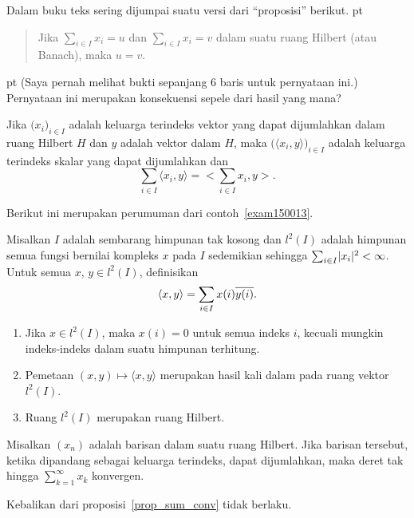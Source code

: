 \begin{rem} Dalam buku teks sering dijumpai suatu versi dari
``proposisi'' berikut.
 pt
\begin{quote}
Jika $\sum_{i \in I}x_i = u$ dan $\sum_{i \in I}x_i = v$ dalam suatu
ruang Hilbert (atau Banach), maka $u = v$.
\end{quote}

  pt
\noindent (Saya pernah melihat bukti sepanjang 6 baris untuk pernyataan ini.) Pernyataan ini merupakan
konsekuensi sepele dari hasil yang mana?
\end{rem}

\begin{prop} Jika $\bigl(x_i\bigr)_{i \in I}$ adalah keluarga terindeks vektor yang dapat dijumlahkan dalam ruang Hilbert $H$ dan
$y$ adalah vektor dalam $H$, maka $\bigl(\langle x_i,y \rangle\bigr)_{i \in I}$ adalah keluarga terindeks skalar yang dapat dijumlahkan dan
   \[ \sum_{i \in I}\langle x_i,y \rangle  = \biggl < \sum_{i \in I} x_i, y \biggr >. \]
\end{prop}

Berikut ini merupakan perumuman dari contoh~\ref{exam150013}.

\begin{exam} Misalkan $I$ adalah sembarang himpunan tak kosong dan $l^2(I)$ adalah himpunan semua fungsi bernilai kompleks $x$ pada $I$ sedemikian sehingga
$\sum_{i \in I}\lvert x_i\rvert^2 < \infty$. Untuk semua $x$, $y \in l^2(I)$, definisikan
    \[ \langle x,y \rangle = \sum_{i \in I}x(i)\overline{y(i)}.\]
  \begin{enumerate}
    \item Jika $x \in l^2(I)$, maka $x(i) = 0$ untuk semua indeks $i$, kecuali mungkin indeks-indeks dalam suatu himpunan terhitung.
    \item Pemetaan $(x,y) \mapsto \langle x,y \rangle$ merupakan hasil kali dalam pada ruang vektor $l^2(I)$.
    \item Ruang $l^2(I)$ merupakan ruang Hilbert.
  \end{enumerate}
\end{exam}

\begin{prop}\label{prop_sum_conv} Misalkan $(x_n)$ adalah barisan dalam suatu ruang Hilbert.  Jika barisan tersebut, ketika dipandang sebagai keluarga terindeks,
dapat dijumlahkan, maka deret tak hingga $\sum_{k=1}^\infty x_k$ konvergen.
\end{prop}

\begin{exam} Kebalikan dari proposisi~\ref{prop_sum_conv} tidak berlaku.
\end{exam}

